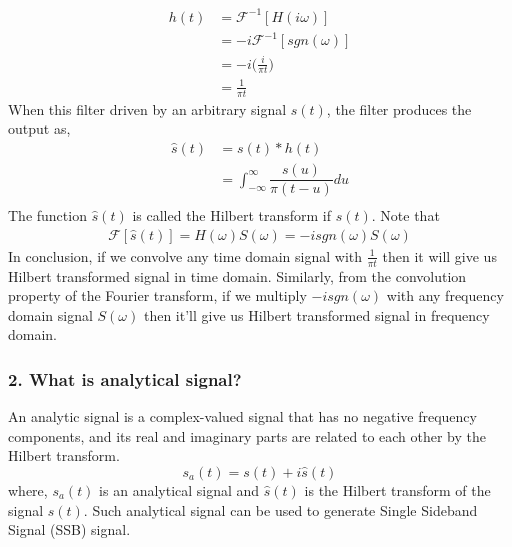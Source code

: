 \begin{equation}
\begin{split}
h(t)&=\mathcal{F}^{-1}[H(i\omega)]\\
&=-i\mathcal{F}^{-1}[sgn(\omega)]\\
&=-i\bigg(\frac{i}{\pi t}\bigg)\\
&=\frac{1}{\pi t}
\end{split}
\label{}
\end{equation}
When this filter driven by an arbitrary signal $s(t)$, the filter produces the output as,
\begin{equation}
\begin{split}
\hat{s}(t)&=s(t) * h(t)\\
&=\int_{-\infty}^{\infty} \dfrac{s(u)}{\pi(t-u)}du\\
\end{split}
\label{}
\end{equation}
The function $\hat{s}(t)$ is called the Hilbert transform if $s(t)$. Note that
\begin{equation}
\begin{split}
\mathcal{F}[\hat{s}(t)]=H(\omega)S(\omega)=-isgn(\omega)S(\omega)
\end{split}
\label{}
\end{equation}
In conclusion, if we convolve any time domain signal with $\frac{1}{\pi t}$ then it will give us Hilbert transformed signal in time domain. Similarly, from the convolution property of the Fourier transform, if we multiply $-isgn(\omega)$ with any frequency domain signal $S(\omega)$ then it'll give us Hilbert transformed signal in frequency domain.

\subsubsection{2. What is analytical signal?}
An analytic signal is a complex-valued signal that has no negative frequency components, and its real and imaginary parts are related to each other by the Hilbert transform.
\begin{equation}
s_a(t)=s(t)+i\hat{s}(t)
\label{Analytical signal}
\end{equation}
where, $s_a(t)$ is an analytical signal and $\hat{s}(t)$ is the Hilbert transform of the signal ${s}(t)$. Such analytical signal can be used to generate Single Sideband Signal (SSB) signal.


